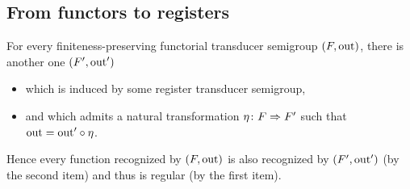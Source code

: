 \documentclass[a4paper,UKenglish,cleveref,autoref,thm-restate,numberwithinsect]{lipics-v2021}
\begin{document}
\subsection{From functors to registers}

\begin{theorem}
  For every finiteness-preserving functorial transducer semigroup $(\functor, \outfun)$, there is another one $(\functor',\outfun')$
  \begin{itemize}
    \item which is induced by some register transducer semigroup,
    \item and which admits a natural transformation $\eta \colon \functor \Rightarrow \functor'$ such that $\mathrm{out} = \mathrm{out}' \circ \eta$.
  \end{itemize}
  Hence every function recognized by $(\functor,\outfun)$ is also recognized by $(\functor',\outfun')$ (by the second item) and thus is regular (by the first item).
\end{theorem}
\end{document}
